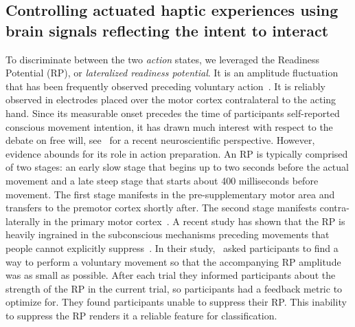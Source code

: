 \subsection{Controlling actuated haptic experiences using brain signals reflecting the intent to interact}

To discriminate between the two \textit{action} states, we leveraged the Readiness Potential (RP), or \textit{lateralized readiness potential}. It is an amplitude fluctuation that has been frequently observed preceding voluntary action~\cite{Deecke1969-bl, Libet1983-qu}. It is reliably observed in electrodes placed over the motor cortex contralateral to the acting hand. Since its measurable onset precedes the time of participants self-reported conscious movement intention, it has drawn much interest with respect to the debate on free will, see~\cite{Schurger2021-vp} for a recent neuroscientific perspective. However, evidence abounds for its role in action preparation. An RP is typically comprised of two stages: an early slow stage that begins up to two seconds before the actual movement and a late steep stage that starts about 400 milliseconds before movement. The first stage manifests in the pre-supplementary motor area and transfers to the premotor cortex shortly after. The second stage manifests contra-laterally in the primary motor cortex~\cite{Shibasaki2006-mt}. A recent study has shown that the RP is heavily ingrained in the subconscious mechanisms preceding movements that people cannot explicitly suppress~\cite{Schultze-Kraft2021-cu}. In their study,~\cite{Schultze-Kraft2021-cu} asked participants to find a way to perform a voluntary movement so that the accompanying RP amplitude was as small as possible. After each trial they informed participants about the strength of the RP in the current trial, so participants had a feedback metric to optimize for. They found participants unable to suppress their RP. This inability to suppress the RP renders it a reliable feature for classification.






